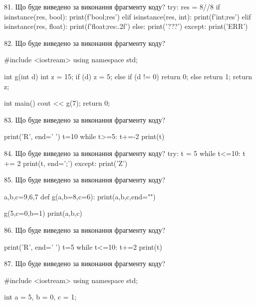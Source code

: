 \documentclass[11pt]{article}
\begin{document}
\vspace{5mm}

81. Що буде виведено за виконання фрагменту коду?
try:
    res = 8//8%
    if isinstance(res, bool):
        print(f'bool;{res}')
    elif isinstance(res, int):
        print(f'int;{res}')
    elif isinstance(res, float):
        print(f'float;{res:.2f}')
    else:
        print('???')
except:
    print('ERR')
\vspace{5mm}

82. Що буде виведено за виконання фрагменту коду?

#include <iostream>
using namespace std;

int g(int d){
    int z = 15;
    if (d) 
        z = 5;
    else if (d != 0)
         return 0;
    else
         return 1;
    return z;
}

int main(){
    cout << g(7);
    return 0;
}

\vspace{5mm}

83. Що буде виведено за виконання фрагменту коду?

print('R', end=' ')
t=10
while t>=5:
    t+=-2
print(t)

\vspace{5mm}

84. Що буде виведено за виконання фрагменту коду?
try:
    t = 5
    while t<=10:
        t += 2
    print(t, end=';')
except:
    print('Z')
\vspace{5mm}

85. Що буде виведено за виконання фрагменту коду?

a,b,c=9,6,7
def g(a,b=8,c=6):
    print(a,b,c,end="")

g(5,c=0,b=1)
print(a,b,c)

\vspace{5mm}

86. Що буде виведено за виконання фрагменту коду?

print('R', end=' ')
t=5
while t<=10:
    t+=2
print(t)

\vspace{5mm}

87. Що буде виведено за виконання фрагменту коду?

#include <iostream>
using namespace std;

int a = 5, b = 0, c = 1;
\end{document}
